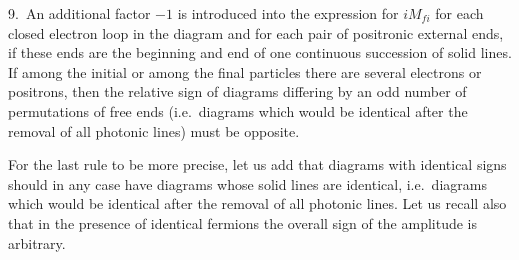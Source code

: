 9.~An additional factor $-1$ is introduced into the expression for $iM_{fi}$ for each closed electron loop in the diagram and for each pair of positronic external ends, if these ends are the beginning and end of one continuous succession of solid lines. If among the initial or among the final particles there are several electrons or positrons, then the relative sign of diagrams differing by an odd number of permutations of free ends (i.e.\ diagrams which would be identical after the removal of all photonic lines) must be opposite.

For the last rule to be more precise, let us add that diagrams with identical signs should in any case have diagrams whose solid lines are identical, i.e.\ diagrams which would be identical after the removal of all photonic lines. Let us recall also that in the presence of identical fermions the overall sign of the amplitude is arbitrary.
